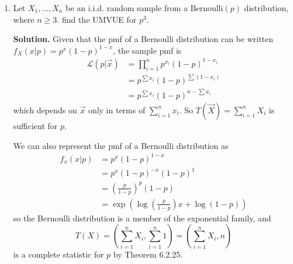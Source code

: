 \documentclass[titlepage]{article}
\begin{document}
\begin{enumerate}
\item Let $X_1, \ldots, X_n$ be an i.i.d. random sample from a $\text{Bernoulli}(p)$ distribution, where $n \geq 3$. find the UMVUE for $p^3$.

\textbf{Solution.} Given that the pmf of a Bernoulli distribution can be written $f_X(x|p) = p^x(1-p)^{1-x}$, the sample pmf is
\[\begin{aligned}
\mathcal{L}(p|\vec{x}) &= \prod_{i=1}^n p^{x_i}(1-p)^{1-x_i} \\
&= p^{\sum x_i}(1-p)^{\sum(1 - x_i)} \\
&= p^{\sum x_i}(1-p)^{n - \sum x_i}
\end{aligned}\]
which depends on $\vec{x}$ only in terms of $\sum_{i=1}^n x_i$. So $T(\vec{X}) = \sum_{i=1}^n X_i$ is sufficient for $p$.

We can also represent the pmf of a Bernoulli distribution as
\[\begin{aligned}
f_x(x|p) &= p^x(1-p)^{1-x} \\
&= p^x (1-p)^{-x}(1-p)^1 \\
&= \left(\frac{p}{1-p}\right)^p (1-p) \\
&= \exp\left(\log\left(\frac{p}{1-p}\right)x + \log(1-p)\right)
\end{aligned}\]
so the Bernoulli distribution is a member of the exponential family, and
  \[T(X) = \left(\sum_{i=1}^n X_i, \sum_{i=1}^n 1\right) = \left(\sum_{i=1}^n X_i, n\right)\]
is a complete statistic for $p$ by Theorem 6.2.25.
\end{enumerate}
\end{document}
